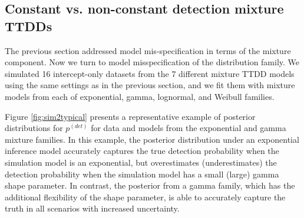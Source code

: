 \documentclass[12pt]{article}
\newcommand{\pdet}{p^{(det)}}
\begin{document}








\subsection{Constant vs. non-constant detection mixture TTDDs}\label{sec:family}

The previous section addressed model mis-specification in terms of the mixture component. 
Now we turn to model misspecification of the distribution family. 
We simulated 16 intercept-only datasets from the 7 different mixture TTDD models using the same settings as in the previous section, and we fit them with mixture models from each of exponential, gamma, lognormal, and Weibull families.

Figure \ref{fig:sim2typical} presents a representative example of posterior distributions for $\pdet$ for data and models from the exponential and gamma mixture families. 
In this example, the posterior distribution under an exponential inference model accurately captures the true detection probability when the simulation model is an exponential, but overestimates (underestimates) the detection probability when the simulation model has a small (large) gamma shape parameter. 
In contrast, the posterior from a gamma family, which has the additional flexibility of the shape parameter, is able to accurately capture the truth in all scenarios with increased uncertainty. 
\end{document}
